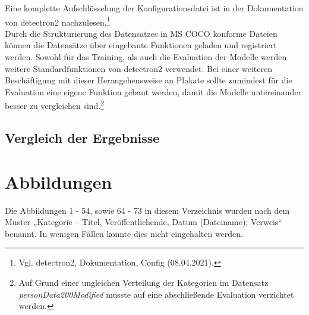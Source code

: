 \documentclass[a4paper,12pt,ngerman]{article}
\begin{document}
Eine komplette Aufschlüsselung der Konfigurationsdatei ist in der Dokumentation von detectron2 nachzulesen.\footnote{Vgl. detectron2, Dokumentation, Config (08.04.2021).} \\

Durch die Strukturierung des Datensatzes in MS COCO konforme Dateien können die Datensätze über eingebaute Funktionen geladen und registriert werden. Sowohl für das Training, als auch die Evaluation der Modelle werden weitere Standardfunktionen von detectron2 verwendet. Bei einer weiteren Beschäftigung mit dieser Herangehensweise an Plakate sollte zumindest für die Evaluation eine eigene Funktion gebaut werden, damit die Modelle untereinander besser zu vergleichen sind.\footnote{Auf Grund einer ungleichen Verteilung der Kategorien im Datensatz \textit{personData200Modified} musste auf eine abschließende Evaluation verzichtet werden.}

\subsection{Vergleich der Ergebnisse}



\newpage

\section{Abbildungen}
Die Abbildungen 1 - 54, sowie 64 - 73 in diesem Verzeichnis wurden nach dem Muster „Kategorie – Titel, Veröffentlichende, Datum (Dateiname); Verweis“ benannt. In wenigen Fällen konnte dies nicht eingehalten werden. \\
\end{document}
